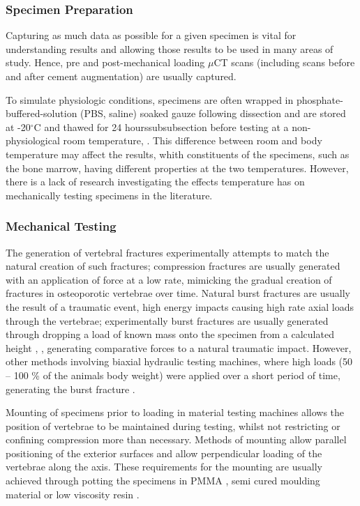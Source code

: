 \subsubsection{Specimen Preparation }\label{specimen-preparation}

Capturing as much data as possible for a given specimen is vital for understanding
results and allowing those results to be used in many areas of study.
Hence, pre and post-mechanical loading $\mu$CT scans (including
scans before and after cement augmentation) are usually captured.

To simulate physiologic conditions, specimens are often wrapped in
phosphate-buffered-solution (PBS, saline) soaked gauze following
dissection \cite{belkoff2002ex} and are stored at -20$^\circ$C and
thawed for 24
hourssubsubsection
before testing at a non-physiological room temperature\cite{tarsuslugil2013development},
\cite{furtado2007biomechanical}. This difference between room and body temperature may affect the results, whith constituents of the specimens, such as the bone marrow, having different properties at the two temperatures. However, there is a lack of research investigating the effects temperature has on mechanically testing specimens in the literature.


\subsubsection{Mechanical Testing }\label{mechanical-testing}

The generation of vertebral fractures experimentally attempts to match the natural
creation of such fractures; compression fractures are usually generated
with an application of force at a low rate, mimicking the gradual creation of fractures in osteoporotic vertebrae
over time. Natural burst fractures are
usually the result of a traumatic event, high energy impacts causing high
rate axial loads through the vertebrae; experimentally burst fractures
are usually generated through dropping a load of known mass onto the
specimen from a calculated height \cite{tarsuslugil2013development},
\cite{wilcox2004dynamic},
generating
comparative forces to a natural traumatic impact. However, other methods
involving biaxial hydraulic testing machines, where high loads (50 --
100 \% of the animals body weight) were applied over a short period of
time, generating the burst fracture \cite{Gurwitz1993}.

Mounting of specimens prior to loading in material testing machines
allows the position of vertebrae to be maintained during testing, whilst
not restricting or confining compression more than necessary. Methods of
mounting allow parallel positioning of the exterior surfaces and allow
perpendicular loading of the vertebrae along the axis. These
requirements for the mounting are usually achieved through potting the
specimens in PMMA \cite{tarsuslugil2013development, furtado2007biomechanical, ananthakrishnan2005effect}, semi
cured moulding
material \cite{berlemann2002adjacent} or low viscosity resin
\cite{pneumaticos2013effect}.

